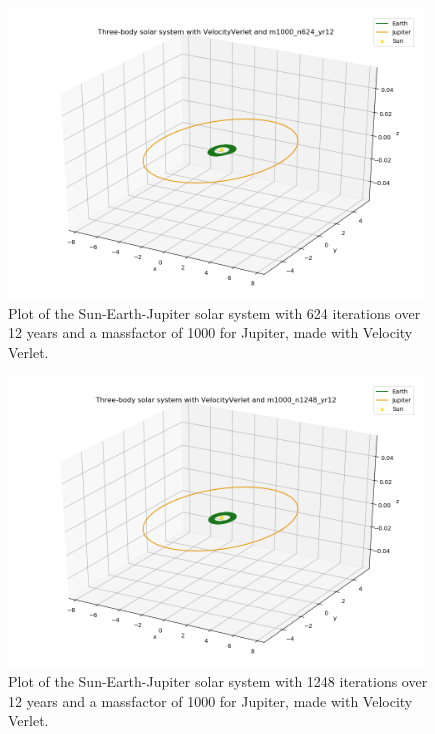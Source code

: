 \documentclass{article}
\begin{document}
    \begin{figure}[H]
        \centering
        \includegraphics[width = 11cm]{img/plot3D_S_E_J_V_m1000_n624_yr12.png}
        \caption{Plot of the Sun-Earth-Jupiter solar system with 624 iterations over 12 years and a massfactor of 1000 for Jupiter, made with Velocity Verlet.}
        \label{fig:plot3D_S_E_J_V_m1000_n624_yr12}
    \end{figure}

    \begin{figure}[H]
        \centering
        \includegraphics[width = 11cm]{img/plot3D_S_E_J_V_m1000_n1248_yr12.png}
        \caption{Plot of the Sun-Earth-Jupiter solar system with 1248 iterations over 12 years and a massfactor of 1000 for Jupiter, made with Velocity Verlet.}
        \label{fig:plot3D_S_E_J_V_m1000_n1248_yr12}
    \end{figure}
\end{document}
